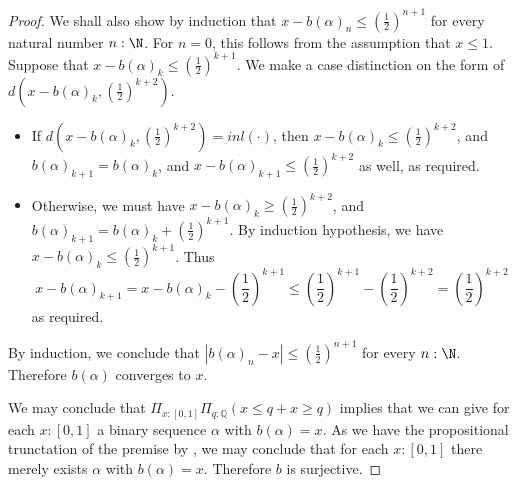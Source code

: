\begin{proof}
  We shall also show by induction that 
  $ x- b(\alpha)_n \leq (\frac12)^{n+1} $
  for every natural number $n:\N$. 
%
  For $n = 0$, this follows from the assumption that $x\leq 1$. 
%
  Suppose that $ x- b(\alpha)_k  \leq (\frac12)^{k+1} $. 
  We make a case distinction on the form of $d(x-b(\alpha)_k, (\frac12)^{k+2})$.
  \begin{itemize}
    \item 
      If $d(x-b(\alpha)_k , (\frac12)^{k+2}) = inl(\cdot)$, 
      then $  x-b(\alpha)_k  \leq (\frac12)^{k+2}$, 
      and $b(\alpha)_{k+1} = b(\alpha)_k$, 
      and $x-b(\alpha)_{k+1}  \leq (\frac12)^{k+2}$ as well, 
      as required. 
    \item 
      Otherwise, we must have
      $ x- b(\alpha)_k  \geq (\frac12)^{k+2}$, 
      and $b(\alpha)_{k+1} = b(\alpha)_k + (\frac12)^{k+1}$.
      By induction hypothesis, we have 
      $x-b(\alpha)_k \leq (\frac12)^{k+1}$. 
      Thus \begin{equation}
        x-b(\alpha)_{k+1} = x - b(\alpha)_k - (\frac12)^{k+1}
        \leq (\frac12)^{k+1} - (\frac12)^{k+2} = (\frac12)^{k+2}
      \end{equation}
      as required. 
  \end{itemize}
  
  By induction, we conclude that 
  $ | b(\alpha)_n - x |  \leq (\frac12)^{n+1} $
  for every $n:\N$. 
  Therefore $b(\alpha)$ converges to $x$. 

  We may conclude that $\Pi_{x:[0,1]} \Pi_{q: \mathbb Q} (x \leq q + x \geq q)$ implies that 
  we can give for each $x: [0,1]$ a binary sequence $\alpha$ with $b(\alpha) = x$. 
  As we have the propositional trunctation of the premise by , 
  we may conclude that for each $x:[0,1]$ there merely exists $\alpha$ with $b(\alpha) = x$. 
  Therefore $b$ is surjective. 
\end{proof}
